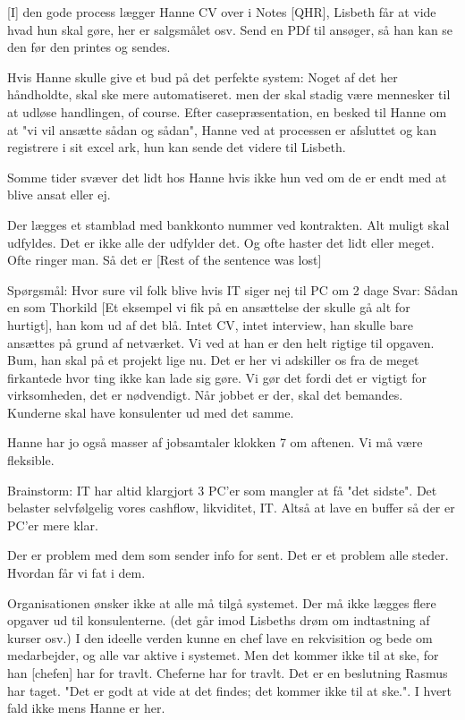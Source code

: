 [I] den gode process lægger Hanne CV over i Notes [QHR], Lisbeth får at vide hvad hun skal gøre, her er salgsmålet osv. Send en PDf til ansøger, så han kan se den før den printes og sendes.

Hvis Hanne skulle give et bud på det perfekte system:
Noget af det her håndholdte, skal ske mere automatiseret. men der skal stadig være mennesker til at udløse handlingen, of course. 
Efter casepræsentation, en besked til Hanne om at "vi vil ansætte sådan og sådan", Hanne ved at processen er afsluttet og kan registrere i sit excel ark, hun kan sende det videre til Lisbeth.

Somme tider svæver det lidt hos Hanne hvis ikke hun ved om de er endt med at blive ansat eller ej.

Der lægges et stamblad med bankkonto nummer ved kontrakten. Alt muligt skal udfyldes. Det er ikke alle der udfylder det. Og ofte haster det lidt eller meget. Ofte ringer man. Så det er [Rest of the sentence was lost]




Spørgsmål:
Hvor sure vil folk blive hvis IT siger nej til PC om 2 dage
Svar:
Sådan en som Thorkild [Et eksempel vi fik på en ansættelse der skulle gå alt for hurtigt], han kom ud af det blå. Intet CV, intet interview, han skulle bare ansættes på grund af netværket. Vi ved at han er den helt rigtige til opgaven. Bum, han skal på et projekt lige nu.
Det er her vi adskiller os fra de meget firkantede hvor ting ikke kan lade sig gøre. 
Vi gør det fordi det er vigtigt for virksomheden, det er nødvendigt. Når jobbet er der, skal det bemandes.
Kunderne skal have konsulenter ud med det samme.

Hanne har jo også masser af jobsamtaler klokken 7 om aftenen. Vi må være fleksible.


Brainstorm: IT har altid klargjort 3 PC'er som mangler at få "det sidste". Det belaster selvfølgelig vores cashflow, likviditet, IT.
Altså at lave en buffer så der er PC'er mere klar. 


Der er problem med dem som sender info for sent. Det er et problem alle steder. Hvordan får vi fat i dem.


Organisationen ønsker ikke at alle må tilgå systemet. Der må ikke lægges flere opgaver ud til konsulenterne. (det går imod Lisbeths drøm om indtastning af kurser osv.)
I den ideelle verden kunne en chef lave en rekvisition og bede om medarbejder, og alle var aktive i systemet. Men det kommer ikke til at ske, for han  [chefen] har for travlt.
Cheferne har for travlt. Det er en beslutning Rasmus har taget. "Det er godt at vide at det findes; det kommer ikke til at ske.". I hvert fald ikke mens Hanne er her.

